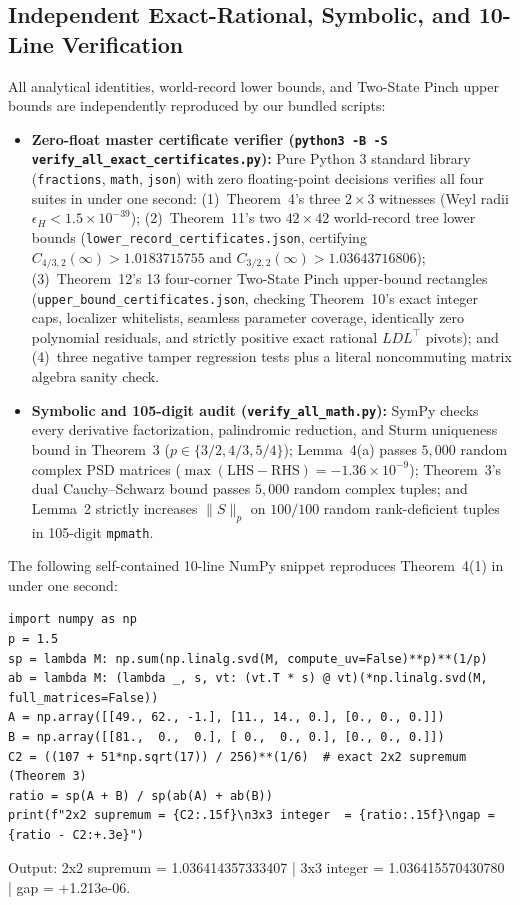 \documentclass[10pt,letterpaper]{article}
\begin{document}
\subsection{Independent Exact-Rational, Symbolic, and 10-Line Verification}

All analytical identities, world-record lower bounds, and Two-State Pinch upper bounds are independently reproduced by our bundled scripts:
\begin{itemize}[leftmargin=1.5em,itemsep=2pt]
  \item \textbf{Zero-float master certificate verifier (\texttt{python3 -B -S verify\_all\_exact\_certificates.py}):} Pure Python 3 standard library (\texttt{fractions}, \texttt{math}, \texttt{json}) with zero floating-point decisions verifies all four suites in under one second: (1)~Theorem~4's three $2\times 3$ witnesses (Weyl radii $\epsilon_H < 1.5\times 10^{-39}$); (2)~Theorem~11's two $42\times 42$ world-record tree lower bounds (\texttt{lower\_record\_certificates.json}, certifying $C_{4/3,2}(\infty) > 1.0183715755$ and $C_{3/2,2}(\infty) > 1.03643716806$); (3)~Theorem~12's 13 four-corner Two-State Pinch upper-bound rectangles (\texttt{upper\_bound\_certificates.json}, checking Theorem~10's exact integer caps, localizer whitelists, seamless parameter coverage, identically zero polynomial residuals, and strictly positive exact rational $LDL^\top$ pivots); and (4)~three negative tamper regression tests plus a literal noncommuting matrix algebra sanity check.
  \item \textbf{Symbolic and 105-digit audit (\texttt{verify\_all\_math.py}):} SymPy checks every derivative factorization, palindromic reduction, and Sturm uniqueness bound in Theorem~3 ($p \in \{3/2, 4/3, 5/4\}$); Lemma~4(a) passes $5{,}000$ random complex PSD matrices ($\max(\mathrm{LHS}-\mathrm{RHS}) = -1.36\times 10^{-9}$); Theorem~3's dual Cauchy--Schwarz bound passes $5{,}000$ random complex tuples; and Lemma~2 strictly increases $\|S\|_p$ on $100/100$ random rank-deficient tuples in 105-digit \texttt{mpmath}.
\end{itemize}

The following self-contained 10-line NumPy snippet reproduces Theorem~4(1) in under one second:
\begin{tcolorbox}[codebox]
\begin{lstlisting}
import numpy as np
p = 1.5
sp = lambda M: np.sum(np.linalg.svd(M, compute_uv=False)**p)**(1/p)
ab = lambda M: (lambda _, s, vt: (vt.T * s) @ vt)(*np.linalg.svd(M, full_matrices=False))
A = np.array([[49., 62., -1.], [11., 14., 0.], [0., 0., 0.]])
B = np.array([[81.,  0.,  0.], [ 0.,  0., 0.], [0., 0., 0.]])
C2 = ((107 + 51*np.sqrt(17)) / 256)**(1/6)  # exact 2x2 supremum (Theorem 3)
ratio = sp(A + B) / sp(ab(A) + ab(B))
print(f"2x2 supremum = {C2:.15f}\n3x3 integer  = {ratio:.15f}\ngap = {ratio - C2:+.3e}")
\end{lstlisting}
\end{tcolorbox}
\vspace{-2pt}
{\ttfamily\footnotesize\color{ink} Output: 2x2 supremum = 1.036414357333407 \;|\; 3x3 integer = 1.036415570430780 \;|\; gap = +1.213e-06.}
\end{document}
